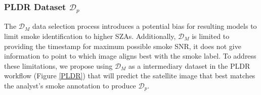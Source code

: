 \documentclass{article}
\begin{document}
\subsubsection{PLDR Dataset \(\mathcal{D}_p\)} 

The \(\mathcal{D}_M\) data selection process introduces a potential bias for resulting models to limit smoke identification to higher SZAs. Additionally, \(\mathcal{D}_M\) is limited to providing the timestamp for maximum possible smoke SNR, it does not give information to point to which image aligns best with the smoke label. To address these limitations, we propose using \(\mathcal{D}_M\) as a intermediary dataset in the PLDR workflow (Figure \ref{PLDR}) that will predict the satellite image that best matches the analyst's smoke annotation to produce \(\mathcal{D}_p\).
\end{document}
